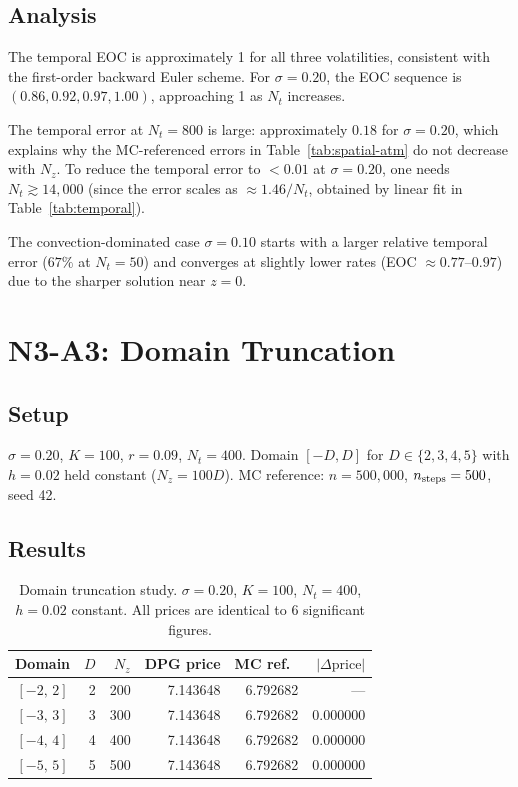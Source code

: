 \documentclass[11pt,a4paper]{article}
\newcommand{\Nz}{N_z}
\newcommand{\Nt}{N_t}
\begin{document}
\subsection{Analysis}

The temporal EOC is approximately 1 for all three volatilities,
consistent with the first-order backward Euler scheme.  For
$\sigma = 0.20$, the EOC sequence is $(0.86, 0.92, 0.97, 1.00)$,
approaching 1 as $\Nt$ increases.

The temporal error at $\Nt = 800$ is large: approximately $0.18$
for $\sigma = 0.20$, which explains why the MC-referenced errors in
Table~\ref{tab:spatial-atm} do not decrease with $\Nz$.
To reduce the temporal error to $< 0.01$ at $\sigma = 0.20$, one
needs $\Nt \gtrsim 14{,}000$ (since the error scales as
$\approx 1.46/\Nt$, obtained by linear fit in Table~\ref{tab:temporal}).

The convection-dominated case $\sigma = 0.10$ starts with a larger
relative temporal error ($67\%$ at $\Nt = 50$) and converges at
slightly lower rates (EOC $\approx 0.77$--$0.97$) due to the sharper
solution near $z = 0$.

\section{N3-A3: Domain Truncation}

\subsection{Setup}

$\sigma = 0.20$, $K = 100$, $r = 0.09$, $\Nt = 400$.  Domain
$[-D, D]$ for $D \in \{2, 3, 4, 5\}$ with $h = 0.02$ held constant
($\Nz = 100D$).  MC reference: $n = 500{,}000$, $n_{\rm steps} = 500$,
seed 42.

\subsection{Results}

\begin{table}[htbp]
\centering
\caption{Domain truncation study.  $\sigma = 0.20$, $K = 100$,
         $\Nt = 400$, $h = 0.02$ constant.  All prices
         are identical to 6 significant figures.}
\label{tab:domain}
\begin{tabular}{crrrrr}
\toprule
Domain & $D$ & $\Nz$ & DPG price & MC ref.\ & $|\Delta\text{price}|$ \\
\midrule
$[-2,\,2]$ & 2 & 200 & 7.143648 & 6.792682 & --- \\
$[-3,\,3]$ & 3 & 300 & 7.143648 & 6.792682 & $0.000000$ \\
$[-4,\,4]$ & 4 & 400 & 7.143648 & 6.792682 & $0.000000$ \\
$[-5,\,5]$ & 5 & 500 & 7.143648 & 6.792682 & $0.000000$ \\
\bottomrule
\end{tabular}
\end{table}
\end{document}
